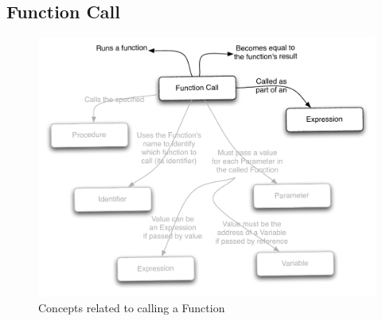 \clearpage
\subsection{Function Call} %
\label{sub:function_call}

\begin{figure}[h]
\includegraphics[width=\textwidth]{topics/function-decl/diagrams/FunctionCall} 
 \caption{Concepts related to calling a Function}
 \label{fig:function-decl-function-call}
\end{figure}


